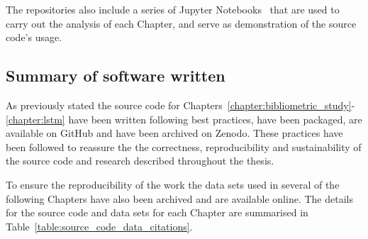 The repositories also include a series of Jupyter Notebooks~\cite{jupyter} that
are used to carry out the analysis of each Chapter, and serve as demonstration
of the source code's usage.

\subsection{Summary of software written}

As previously stated the source code for
Chapters~\ref{chapter:bibliometric_study}-\ref{chapter:lstm} have been written
following best practices, have been packaged, are available on GitHub and have
been archived on Zenodo. These practices have been followed to reassure the the
correctness, reproducibility and sustainability of the source code and research
described throughout the thesis.

To ensure the reproducibility of the work the data sets used in several of
the following Chapters have also been archived and are available online. The details
for the source code and data sets for each Chapter are summarised in
Table~\ref{table:source_code_data_citations}.

\begin{table}[htbp]
    \centering
    \caption{Citations and GitHub url for source code and data used in the thesis.}
    \label{table:source_code_data_citations}
\end{table}


